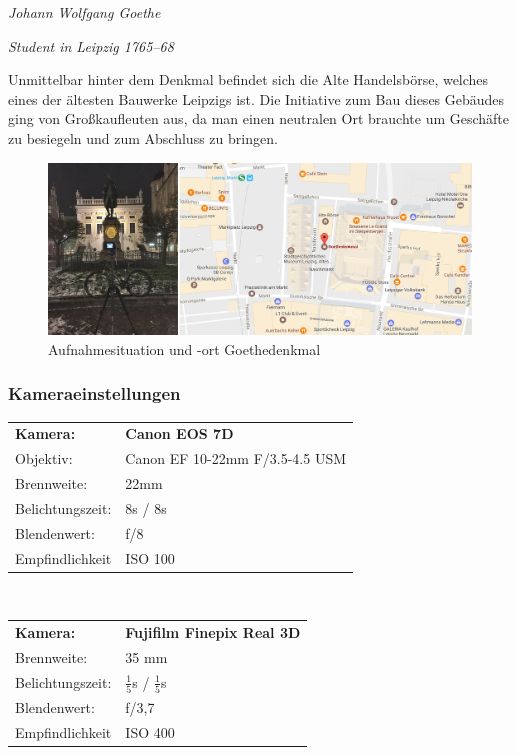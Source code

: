 \documentclass[liststotoc,bibtotoc,fontsize=14pt,]{scrreprt}
\begin{document}
	\bigskip
	\begin{center} 
		\textit{Johann Wolfgang Goethe} 
		
		\textit{Student in Leipzig 1765–68} 
	\end{center}
	
	\bigskip
	Unmittelbar hinter dem Denkmal befindet sich die Alte Handelsbörse, welches eines der ältesten Bauwerke Leipzigs ist. Die Initiative zum Bau dieses Gebäudes ging von Großkaufleuten aus, da man einen neutralen Ort brauchte um Geschäfte zu besiegeln und zum Abschluss zu bringen. 
	
			\begin{figure}[H]
				\includegraphics[width=\linewidth]{img/places/goe.jpg}
				\caption{Aufnahmesituation und -ort Goethedenkmal}
				\label{img:oer}
			\end{figure}
			
			\subsubsection{Kameraeinstellungen}
			\begin{tabular}{ll}
				\textbf{Kamera:} &\textbf{Canon EOS 7D} \\
				Objektiv: &Canon EF 10-22mm F/3.5-4.5 USM\\		
				Brennweite:& 22mm \\
				Belichtungszeit: & 8s / 8s\\
				Blendenwert: & f/8\\
				Empfindlichkeit & ISO 100 \\
			\end{tabular}\\
			
			\begin{tabular}{ll}
				\textbf{Kamera:} &\textbf{Fujifilm Finepix Real 3D} \\
				Brennweite:& 35 mm \\
				Belichtungszeit: & $\frac{1}{5}$s / $\frac{1}{5}$s\\
				Blendenwert: & f/3,7\\
				Empfindlichkeit & ISO 400 \\
			\end{tabular}\\
	
\end{document}
